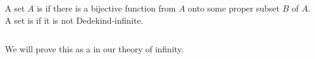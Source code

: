 \begin{frame}{}
  \begin{definition}
    A set $A$ is  
    if there is a bijective function from $A$ onto some proper subset $B$ of $A$. \\[8pt]
    
    A set is  if it is not Dedekind-infinite.
  \end{definition}

  \pause
  \begin{columns}
  \end{columns}

  \begin{center}
    We will prove this as a  in our theory of infinity.
  \end{center}
\end{frame}

\begin{frame}{}

  \begin{center}
  \end{center}
\end{frame}

